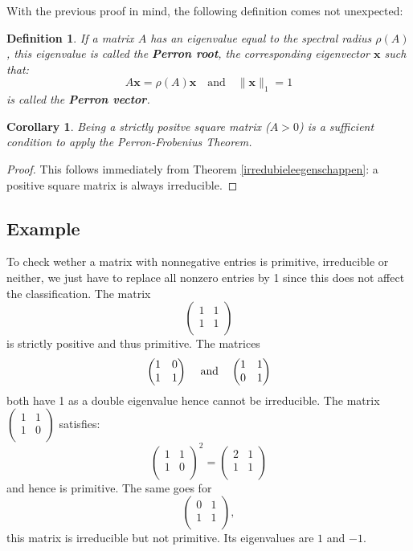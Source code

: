 \documentclass[a4paper,11pt]{report}
\newtheorem{definition}[theorem]{Definition}
\newtheorem{corollary}[theorem]{Corollary}
\begin{document}
   
   With the previous proof in mind, the following definition comes not unexpected:
   
   \begin{definition}\label{perronroot}
     If a matrix $A$ has an eigenvalue equal to the spectral radius $\rho(A)$, this eigenvalue
     is called the \textbf{Perron root}, the corresponding eigenvector $\mathbf{x}$ such that:
     $$A\mathbf{x} = \rho(A)\mathbf{x} \quad \text{and} \quad \|\mathbf{x}\|_1 = 1$$ is called 
     the \textbf{Perron vector}.
   \end{definition}

\begin{corollary}
  Being a strictly positve square matrix ($A >0$) is a sufficient condition to apply the Perron-Frobenius Theorem.
\end{corollary}
\begin{proof}
  This follows immediately from Theorem \ref{irredubieleegenschappen}: a 
  positive square matrix is always irreducible.
\end{proof}  

\subsection{Example}
To check wether a matrix with nonnegative entries is primitive, irreducible or 
neither, we just have to replace all nonzero entries by 1 since this does not 
affect the classification. The matrix
$$\begin{pmatrix}1 & 1\\
1 & 1 \\
\end{pmatrix}$$
is strictly positive and thus primitive. The matrices
$$\begin{pmatrix}1 & 0\\
1 & 1 \\
\end{pmatrix}\text{\;\;\; and \;\;\,} 
\begin{pmatrix}
1 & 1\\
0 & 1 \\
\end{pmatrix}$$
both have 1 as a double eigenvalue hence cannot be irreducible.
The matrix $\begin{pmatrix}
1 & 1\\
1 & 0 \\
\end{pmatrix}$ satisfies:
$$\begin{pmatrix}
1 & 1\\
1 & 0 \\
\end{pmatrix}^2 = \begin{pmatrix}
2 & 1\\
1 & 1 \\
\end{pmatrix}$$
and hence is primitive. The same goes for $$\begin{pmatrix}
0 & 1\\
1 & 1 \\
\end{pmatrix},$$ this matrix is irreducible but not primitive. Its 
eigenvalues are $1$ and $-1$.
\newpage
\end{document}
